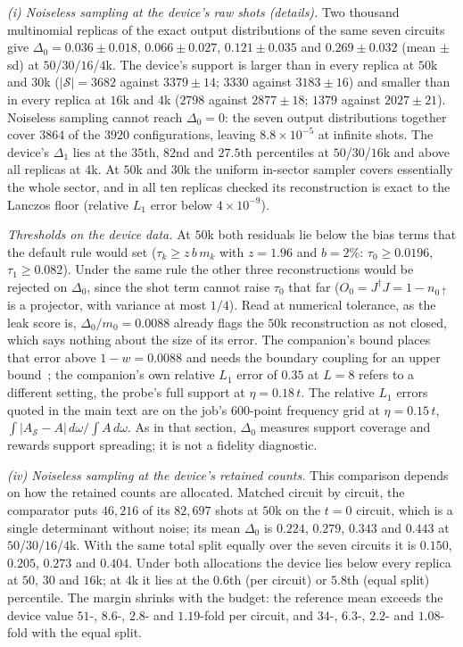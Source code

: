\documentclass[aps,prb,onecolumn,superscriptaddress,longbibliography,floatfix]{revtex4-2}
\begin{document}
\emph{(i) Noiseless sampling at the device's raw shots (details).} Two thousand multinomial replicas of the exact output distributions of the same seven circuits give $\Delta_0={0.036\pm0.018}$, ${0.066\pm0.027}$, ${0.121\pm0.035}$ and ${0.269\pm0.032}$ (mean $\pm$ sd) at $50$/$30$/$16$/$4$k. The device's support is larger than in every replica at $50$k and $30$k ($|\mathcal S|=3682$ against ${3379\pm14}$; $3330$ against ${3183\pm16}$) and smaller than in every replica at $16$k and $4$k ($2798$ against ${2877\pm18}$; $1379$ against ${2027\pm21}$). Noiseless sampling cannot reach $\Delta_0=0$: the seven output distributions together cover $3864$ of the $3920$ configurations, leaving $8.8\times10^{-5}$ at infinite shots. The device's $\Delta_1$ lies at the $35$th, $82$nd and $27.5$th percentiles at $50$/$30$/$16$k and above all replicas at $4$k. At $50$k and $30$k the uniform in-sector sampler covers essentially the whole sector, and in all ten replicas checked its reconstruction is exact to the Lanczos floor (relative $L_1$ error below $4\times10^{-9}$).

\emph{Thresholds on the device data.} At $50$k both residuals lie below the bias terms that the default rule would set ($\tau_k\ge z\,b\,m_k$ with $z=1.96$ and $b=2\%$: $\tau_0\ge0.0196$, $\tau_1\ge0.082$). Under the same rule the other three reconstructions would be rejected on $\Delta_0$, since the shot term cannot raise $\tau_0$ that far ($O_0=J^\dagger J=1-n_{0\uparrow}$ is a projector, with variance at most $1/4$). Read at numerical tolerance, as the leak score is, $\Delta_0/m_0=0.0088$ already flags the $50$k reconstruction as not closed, which says nothing about the size of its error. The companion's bound places that error above $1-w=0.0088$ and needs the boundary coupling for an upper bound~\cite{SQDspec2608}; the companion's own relative $L_1$ error of $0.35$ at $L=8$ refers to a different setting, the probe's full support at $\eta=0.18\,t$. The relative $L_1$ errors quoted in the main text are on the job's $600$-point frequency grid at $\eta=0.15\,t$, ${\int|A_\mathcal S-A|\,d\omega/\!\int A\,d\omega}$. As in that section, $\Delta_0$ measures support coverage and rewards support spreading; it is not a fidelity diagnostic.

\emph{(iv) Noiseless sampling at the device's retained counts.} This comparison depends on how the retained counts are allocated. Matched circuit by circuit, the comparator puts $46{,}216$ of its $82{,}697$ shots at $50$k on the $t=0$ circuit, which is a single determinant without noise; its mean $\Delta_0$ is $0.224$, $0.279$, $0.343$ and $0.443$ at $50$/$30$/$16$/$4$k. With the same total split equally over the seven circuits it is $0.150$, $0.205$, $0.273$ and $0.404$. Under both allocations the device lies below every replica at $50$, $30$ and $16$k; at $4$k it lies at the $0.6$th (per circuit) or $5.8$th (equal split) percentile. The margin shrinks with the budget: the reference mean exceeds the device value $51$-, $8.6$-, $2.8$- and $1.19$-fold per circuit, and $34$-, $6.3$-, $2.2$- and $1.08$-fold with the equal split.
\end{document}
